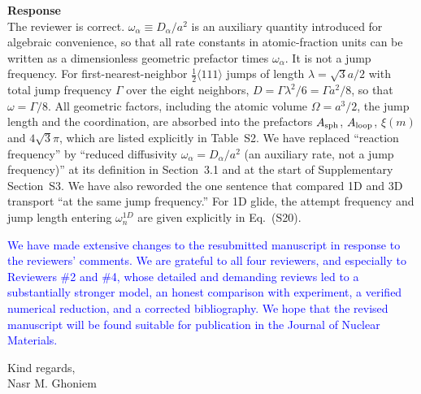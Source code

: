 \documentclass{article}
\newif\ifshowauthornotes
\newcommand{\authornote}[1]{\ifshowauthornotes{\color{red}\ [\textbf{Author action:} #1]}\fi}
\newcommand{\hkl}[1]{\langle #1\rangle}
\newcommand{\half}{\tfrac{1}{2}}
\begin{document}
\begin{itemize}
\textbf{Response}\\
The reviewer is correct. $\omega_\alpha\equiv D_\alpha/a^2$ is an auxiliary quantity introduced for algebraic convenience, so that all rate constants in atomic-fraction units can be written as a dimensionless geometric prefactor times $\omega_\alpha$. It is not a jump frequency. For first-nearest-neighbor $\half\hkl{111}$ jumps of length $\lambda=\sqrt{3}a/2$ with total jump frequency $\Gamma$ over the eight neighbors, $D=\Gamma\lambda^2/6=\Gamma a^2/8$, so that $\omega=\Gamma/8$. All geometric factors, including the atomic volume $\Omega=a^3/2$, the jump length and the coordination, are absorbed into the prefactors $A_{\rm sph}$, $A_{\rm loop}$, $\xi(m)$ and $4\sqrt{3}\pi$, which are listed explicitly in Table~S2. We have replaced ``reaction frequency'' by ``reduced diffusivity $\omega_\alpha=D_\alpha/a^2$ (an auxiliary rate, not a jump frequency)'' at its definition in Section~3.1 and at the start of Supplementary Section~S3. We have also reworded the one sentence that compared 1D and 3D transport ``at the same jump frequency.'' For 1D glide, the attempt frequency and jump length entering $\omega^{1D}_n$ are given explicitly in Eq.~(S20).

\authornote{Make the terminology change at the definitions in Section~3.1 and S3 (the September 17 PDF still says ``reaction frequencies $\omega_\alpha=D_\alpha/a^2$''), reword the ``at the same jump frequency'' sentence after Eq.~(S24), and check that the prefactor $3/2$ in Eq.~(S20) is consistent with $\omega=\Gamma/8$ for 1D glide.}
\end{itemize}

\newpage

\textcolor{blue}{
We have made extensive changes to the resubmitted manuscript in response to the reviewers' comments. We are grateful to all four reviewers, and especially to Reviewers \#2 and \#4, whose detailed and demanding reviews led to a substantially stronger model, an honest comparison with experiment, a verified numerical reduction, and a corrected bibliography. We hope that the revised manuscript will be found suitable for publication in the Journal of Nuclear Materials.\\}

\noindent Kind regards,\\
Nasr M. Ghoniem
\end{document}
